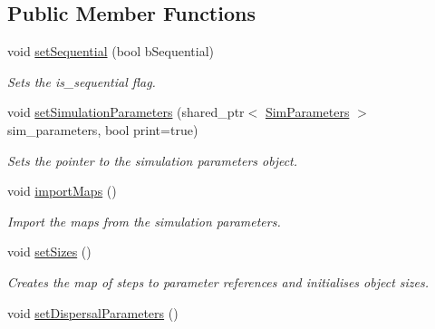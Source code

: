 \subsection*{Public Member Functions}
\begin{DoxyCompactItemize}
\item 
void \hyperlink{class_simulate_dispersal_a3da09319132db8c7ad035290be6590ef}{set\+Sequential} (bool b\+Sequential)
\begin{DoxyCompactList}\small\item\em Sets the is\+\_\+sequential flag. \end{DoxyCompactList}\item 
void \hyperlink{class_simulate_dispersal_a521c2254ee4e95542e939e8595fa5e4c}{set\+Simulation\+Parameters} (shared\+\_\+ptr$<$ \hyperlink{struct_sim_parameters}{Sim\+Parameters} $>$ sim\+\_\+parameters, bool print=true)
\begin{DoxyCompactList}\small\item\em Sets the pointer to the simulation parameters object. \end{DoxyCompactList}\item 
void \hyperlink{class_simulate_dispersal_a275eef6872de493273fc047467935d7b}{import\+Maps} ()\hypertarget{class_simulate_dispersal_a275eef6872de493273fc047467935d7b}{}\label{class_simulate_dispersal_a275eef6872de493273fc047467935d7b}

\begin{DoxyCompactList}\small\item\em Import the maps from the simulation parameters. \end{DoxyCompactList}\item 
void \hyperlink{class_simulate_dispersal_a7aeeb01c40f5de7f88bce2b484bf83a0}{set\+Sizes} ()\hypertarget{class_simulate_dispersal_a7aeeb01c40f5de7f88bce2b484bf83a0}{}\label{class_simulate_dispersal_a7aeeb01c40f5de7f88bce2b484bf83a0}

\begin{DoxyCompactList}\small\item\em Creates the map of steps to parameter references and initialises object sizes. \end{DoxyCompactList}\item 
void \hyperlink{class_simulate_dispersal_a4acdae18451d1e9f67c005390b89664f}{set\+Dispersal\+Parameters} ()\hypertarget{class_simulate_dispersal_a4acdae18451d1e9f67c005390b89664f}{}\label{class_simulate_dispersal_a4acdae18451d1e9f67c005390b89664f}


\end{DoxyCompactItemize}

